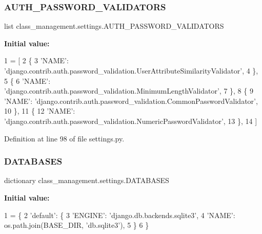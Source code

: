 \subsubsection{\texorpdfstring{A\+U\+T\+H\+\_\+\+P\+A\+S\+S\+W\+O\+R\+D\+\_\+\+V\+A\+L\+I\+D\+A\+T\+O\+RS}{AUTH\_PASSWORD\_VALIDATORS}}
{\footnotesize\ttfamily list class\+\_\+management.\+settings.\+A\+U\+T\+H\+\_\+\+P\+A\+S\+S\+W\+O\+R\+D\+\_\+\+V\+A\+L\+I\+D\+A\+T\+O\+RS}

{\bfseries Initial value\+:}
\begin{DoxyCode}
1 =  [
2     \{
3         \textcolor{stringliteral}{'NAME'}: \textcolor{stringliteral}{'django.contrib.auth.password\_validation.UserAttributeSimilarityValidator'},
4     \},
5     \{
6         \textcolor{stringliteral}{'NAME'}: \textcolor{stringliteral}{'django.contrib.auth.password\_validation.MinimumLengthValidator'},
7     \},
8     \{
9         \textcolor{stringliteral}{'NAME'}: \textcolor{stringliteral}{'django.contrib.auth.password\_validation.CommonPasswordValidator'},
10     \},
11     \{
12         \textcolor{stringliteral}{'NAME'}: \textcolor{stringliteral}{'django.contrib.auth.password\_validation.NumericPasswordValidator'},
13     \},
14 ]
\end{DoxyCode}


Definition at line 98 of file settings.\+py.

\hypertarget{namespaceclass__management_1_1settings_adeef715262ed590270c4769246276829}{}\label{namespaceclass__management_1_1settings_adeef715262ed590270c4769246276829} 
\subsubsection{\texorpdfstring{D\+A\+T\+A\+B\+A\+S\+ES}{DATABASES}}
{\footnotesize\ttfamily dictionary class\+\_\+management.\+settings.\+D\+A\+T\+A\+B\+A\+S\+ES}

{\bfseries Initial value\+:}
\begin{DoxyCode}
1 =  \{
2     \textcolor{stringliteral}{'default'}: \{
3         \textcolor{stringliteral}{'ENGINE'}: \textcolor{stringliteral}{'django.db.backends.sqlite3'},
4         \textcolor{stringliteral}{'NAME'}: os.path.join(BASE\_DIR, \textcolor{stringliteral}{'db.sqlite3'}),
5     \}
6 \}
\end{DoxyCode}


